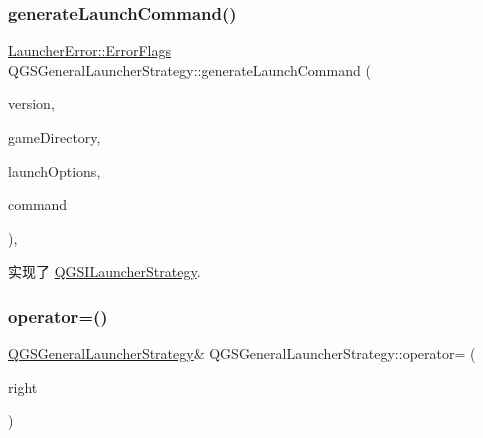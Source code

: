 \subsubsection{\texorpdfstring{generate\+Launch\+Command()}{generateLaunchCommand()}}
{\footnotesize\ttfamily \mbox{\hyperlink{namespace_launcher_error_ac3a8c0329368b890069c60ac80628085}{Launcher\+Error\+::\+Error\+Flags}} Q\+G\+S\+General\+Launcher\+Strategy\+::generate\+Launch\+Command (\begin{DoxyParamCaption}\item[{const \mbox{\hyperlink{class_q_g_s_game_version}{Q\+G\+S\+Game\+Version}} \&}]{version,  }\item[{\mbox{\hyperlink{class_q_g_s_game_directory}{Q\+G\+S\+Game\+Directory}} \&}]{game\+Directory,  }\item[{const \mbox{\hyperlink{class_q_g_s_launch_options}{Q\+G\+S\+Launch\+Options}} $\ast$}]{launch\+Options,  }\item[{Q\+String \&}]{command }\end{DoxyParamCaption})\hspace{0.3cm}{\ttfamily [override]}, {\ttfamily [virtual]}}



实现了 \mbox{\hyperlink{class_q_g_s_i_launcher_strategy_ab09ca6f8e4bbe0a2d6bdb6848c18638b}{Q\+G\+S\+I\+Launcher\+Strategy}}.

\mbox{\label{class_q_g_s_general_launcher_strategy_a0ca98a1ba31ce11c116f0b41b31785ea}} 
\subsubsection{\texorpdfstring{operator=()}{operator=()}\hspace{0.1cm}{\footnotesize\ttfamily [1/2]}}
{\footnotesize\ttfamily \mbox{\hyperlink{class_q_g_s_general_launcher_strategy}{Q\+G\+S\+General\+Launcher\+Strategy}}\& Q\+G\+S\+General\+Launcher\+Strategy\+::operator= (\begin{DoxyParamCaption}\item[{const \mbox{\hyperlink{class_q_g_s_general_launcher_strategy}{Q\+G\+S\+General\+Launcher\+Strategy}} \&}]{right }\end{DoxyParamCaption})\hspace{0.3cm}{\ttfamily [delete]}}

